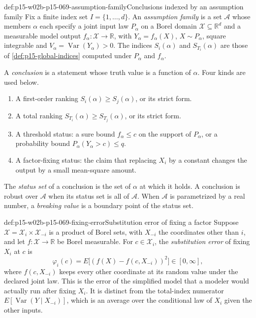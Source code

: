 \begin{hbdefinition}{def:p15-w02b-p15-069-assumption-family}{Conclusions indexed by an assumption family}
Fix a finite index set \(I=\{1,\ldots,d\}\). An \emph{assumption family}
is a set \(\mathcal A\) whose members \(\alpha\) each specify a joint input
law \(P_\alpha\) on a Borel domain \(\mathcal X\subseteq\mathbb R^d\) and a
measurable model output \(f_\alpha:\mathcal X\to\mathbb R\), with
\(Y_\alpha=f_\alpha(X)\), \(X\sim P_\alpha\), square integrable and
\(V_\alpha=\operatorname{Var}(Y_\alpha)>0\). The indices
\(S_i(\alpha)\) and \(S_{T_i}(\alpha)\) are those of
\cref{def:p15-global-indices} computed under \(P_\alpha\) and \(f_\alpha\).

A \emph{conclusion} is a statement whose truth value is a function of
\(\alpha\). Four kinds are used below.
\begin{enumerate}
\item A first-order ranking \(S_i(\alpha)\geq S_j(\alpha)\), or its strict form.
\item A total ranking \(S_{T_i}(\alpha)\geq S_{T_j}(\alpha)\), or its strict form.
\item A threshold status: a sure bound \(f_\alpha\leq c\) on the support
 of \(P_\alpha\), or a probability bound \(P_\alpha(Y_\alpha>c)\leq q\).
\item A factor-fixing status: the claim that replacing \(X_i\) by a
 constant changes the output by a small mean-square amount.
\end{enumerate}
The \emph{status set} of a conclusion is the set of \(\alpha\) at which it
holds. A conclusion is robust over \(\mathcal A\) when its status set is
all of \(\mathcal A\). When \(\mathcal A\) is parametrized by a real
number, a \emph{breaking value} is a boundary point of the status set.
\end{hbdefinition}

\begin{hbdefinition}{def:p15-w02b-p15-069-fixing-error}{Substitution error of fixing a factor}
Suppose \(\mathcal X=\mathcal X_i\times\mathcal X_{-i}\) is a product of
Borel sets, with \(X_{-i}\) the coordinates other than \(i\), and let
\(f:\mathcal X\to\mathbb R\) be Borel measurable. For \(c\in\mathcal X_i\),
the \emph{substitution error} of fixing \(X_i\) at \(c\) is
\[
 \varphi_i(c)=E\bigl[(f(X)-f(c,X_{-i}))^2\bigr]\in[0,\infty],
\]
where \(f(c,X_{-i})\) keeps every other coordinate at its random value
under the declared joint law. This is the error of the simplified model
that a modeler would actually run after fixing \(X_i\). It is distinct
from the total-index numerator \(E[\operatorname{Var}(Y\mid X_{-i})]\),
which is an average over the conditional law of \(X_i\) given the other
inputs.
\end{hbdefinition}

